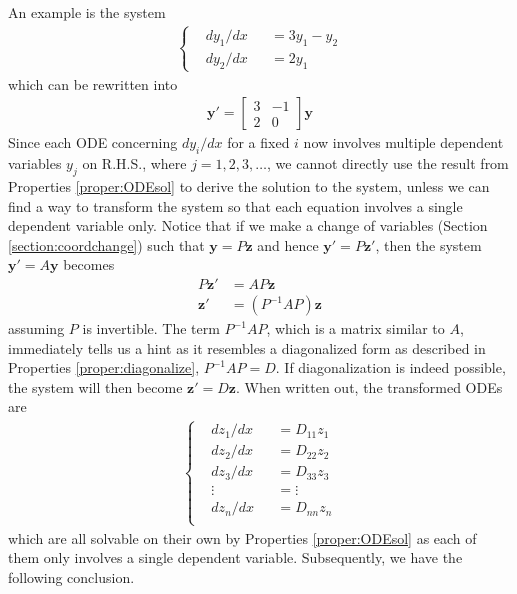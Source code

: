 An example is the system
\begin{align*}
\left\{\begin{alignedat}{2}
&dy_1/dx & &= 3y_1 - y_2 \\
&dy_2/dx & &= 2y_1
\end{alignedat}\right.
\end{align*}
which can be rewritten into
\begin{align*}
\textbf{y}' =
\begin{bmatrix}
3 & -1 \\
2 & 0
\end{bmatrix}
\textbf{y}
\end{align*}
Since each ODE concerning $dy_i/dx$ for a fixed $i$ now involves multiple dependent variables $y_j$ on R.H.S., where $j = 1,2,3,\ldots$, we cannot directly use the result from Properties \ref{proper:ODEsol} to derive the solution to the system, unless we can find a way to transform the system so that each equation involves a single dependent variable only. Notice that if we make a change of variables (Section \ref{section:coordchange}) such that $\textbf{y} = P\textbf{z}$ and hence $\textbf{y}' = P\textbf{z}'$, then the system $\textbf{y}' = A\textbf{y}$ becomes
\begin{align*}
P\textbf{z}' &= AP\textbf{z} \\
\textbf{z}' &= (P^{-1}AP)\textbf{z}
\end{align*}
assuming $P$ is invertible. The term $P^{-1}AP$, which is a matrix similar to $A$, immediately tells us a hint as it resembles a diagonalized form as described in Properties \ref{proper:diagonalize}, $P^{-1}AP = D$. If diagonalization is indeed possible, the system will then become $\textbf{z}' = D\textbf{z}$. When written out, the transformed ODEs are
\begin{align}
\left\{\begin{alignedat}{2}
& dz_1/dx & &= D_{11}z_1 \\
& dz_2/dx & &= D_{22}z_2 \\
& dz_3/dx & &= D_{33}z_3 \\
& \vdots & &= \vdots \\
& dz_n/dx & &= D_{nn}z_n \\
\end{alignedat}\right.    
\end{align}
which are all solvable on their own by Properties \ref{proper:ODEsol} as each of them only involves a single dependent variable. Subsequently, we have the following conclusion.
